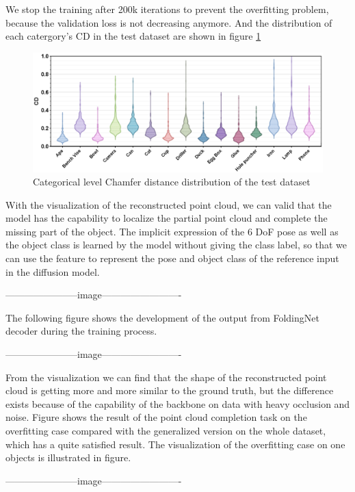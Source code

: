 \documentclass[12pt,DIV14,BCOR12mm,a4paper,footinclude=false,headinclude,parskip=half-,twoside,openright,cleardoublepage=empty,toc=index,bibliography=totoc,listof=totoc]{scrreprt}
\numberwithin{equation}{chapter}
\begin{document}
We stop the training after 200k iterations to prevent the overfitting problem, because the validation loss is not decreasing anymore. And the distribution of each catergory's CD in the test dataset are shown in figure \ref{img:cd_cate} 

\begin{figure}[h]
	\centering
	\includegraphics[width=1.\textwidth]{img/cd_category.eps}
	\caption{Categorical level Chamfer distance distribution of the test dataset}
	\label{img:cd_cate}
\end{figure}

With the visualization of the reconstructed point cloud, we can valid that the model has the capability to localize the partial point cloud and complete the missing part of the object. The implicit expression of the 6 DoF pose as well as the object class is learned by the model without giving the class label, so that we can use the feature to represent the pose and object class of the reference input in the diffusion model.

-----------------------image-------------------------

The following figure shows the development of the output from FoldingNet decoder during the training process.

-----------------------image-------------------------

From the visualization we can find that the shape of the reconstructed point cloud is getting more and more similar to the ground truth, but the difference exists because of the capability of the backbone on data with heavy occlusion and noise. Figure shows the result of the point cloud completion task on the overfitting case compared with the generalized version on the whole dataset, which has a quite satisfied result. The visualization of the overfitting case on one objects is illustrated in figure.

-----------------------image-------------------------
\end{document}
